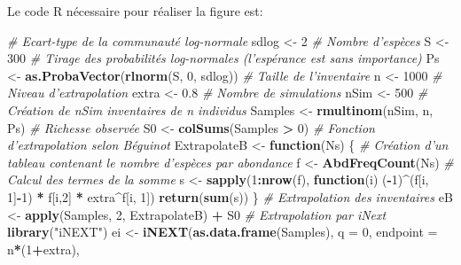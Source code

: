 \documentclass[
  11pt,
  french,
  a4paper,
  extrafontsizes,onecolumn,openright
  ]{memoir}
\newenvironment{Shaded}{\begin{snugshade}}{\end{snugshade}}
\newcommand{\CommentTok}[1]{\textcolor[rgb]{0.56,0.35,0.01}{\textit{#1}}}
\newcommand{\ControlFlowTok}[1]{\textcolor[rgb]{0.13,0.29,0.53}{\textbf{#1}}}
\newcommand{\DataTypeTok}[1]{\textcolor[rgb]{0.13,0.29,0.53}{#1}}
\newcommand{\DecValTok}[1]{\textcolor[rgb]{0.00,0.00,0.81}{#1}}
\newcommand{\FloatTok}[1]{\textcolor[rgb]{0.00,0.00,0.81}{#1}}
\newcommand{\KeywordTok}[1]{\textcolor[rgb]{0.13,0.29,0.53}{\textbf{#1}}}
\newcommand{\NormalTok}[1]{#1}
\newcommand{\OperatorTok}[1]{\textcolor[rgb]{0.81,0.36,0.00}{\textbf{#1}}}
\newcommand{\StringTok}[1]{\textcolor[rgb]{0.31,0.60,0.02}{#1}}
\begin{document}
Le code R nécessaire pour réaliser la figure est:

\scriptsize

\begin{Shaded}
\begin{Highlighting}[]
\CommentTok{# Ecart-type de la communauté log-normale}
\NormalTok{sdlog <-}\StringTok{ }\DecValTok{2}
\CommentTok{# Nombre d'espèces}
\NormalTok{S <-}\StringTok{ }\DecValTok{300}
\CommentTok{# Tirage des probabilités log-normales (l'espérance est sans importance)}
\NormalTok{Ps <-}\StringTok{ }\KeywordTok{as.ProbaVector}\NormalTok{(}\KeywordTok{rlnorm}\NormalTok{(S, }\DecValTok{0}\NormalTok{, sdlog))}
\CommentTok{# Taille de l'inventaire}
\NormalTok{n <-}\StringTok{ }\DecValTok{1000}
\CommentTok{# Niveau d'extrapolation}
\NormalTok{extra <-}\StringTok{ }\FloatTok{0.8}
\CommentTok{# Nombre de simulations}
\NormalTok{nSim <-}\StringTok{ }\DecValTok{500}
\CommentTok{# Création de nSim inventaires de n individus}
\NormalTok{Samples <-}\StringTok{ }\KeywordTok{rmultinom}\NormalTok{(nSim, n, Ps)}
\CommentTok{# Richesse observée}
\NormalTok{S0 <-}\StringTok{ }\KeywordTok{colSums}\NormalTok{(Samples }\OperatorTok{>}\StringTok{ }\DecValTok{0}\NormalTok{)}
\CommentTok{# Fonction d'extrapolation selon Béguinot}
\NormalTok{ExtrapolateB <-}\StringTok{ }\ControlFlowTok{function}\NormalTok{(Ns) \{}
  \CommentTok{# Création d'un tableau contenant le nombre d'espèces par abondance}
\NormalTok{  f <-}\StringTok{ }\KeywordTok{AbdFreqCount}\NormalTok{(Ns)}
  \CommentTok{# Calcul des termes de la somme}
\NormalTok{  s <-}\StringTok{ }\KeywordTok{sapply}\NormalTok{(}\DecValTok{1}\OperatorTok{:}\KeywordTok{nrow}\NormalTok{(f), }\ControlFlowTok{function}\NormalTok{(i) }
\NormalTok{              (}\OperatorTok{-}\DecValTok{1}\NormalTok{)}\OperatorTok{^}\NormalTok{(f[i, }\DecValTok{1}\NormalTok{]}\OperatorTok{-}\DecValTok{1}\NormalTok{) }\OperatorTok{*}\StringTok{ }\NormalTok{f[i,}\DecValTok{2}\NormalTok{] }\OperatorTok{*}\StringTok{ }\NormalTok{extra}\OperatorTok{^}\NormalTok{f[i, }\DecValTok{1}\NormalTok{])}
  \KeywordTok{return}\NormalTok{(}\KeywordTok{sum}\NormalTok{(s))}
\NormalTok{\}}
\CommentTok{# Extrapolation des inventaires}
\NormalTok{eB <-}\StringTok{ }\KeywordTok{apply}\NormalTok{(Samples, }\DecValTok{2}\NormalTok{, ExtrapolateB) }\OperatorTok{+}\StringTok{ }\NormalTok{S0}
\CommentTok{# Extrapolation par iNext}
\KeywordTok{library}\NormalTok{(}\StringTok{"iNEXT"}\NormalTok{)}
\NormalTok{ei <-}\StringTok{ }\KeywordTok{iNEXT}\NormalTok{(}\KeywordTok{as.data.frame}\NormalTok{(Samples), }\DataTypeTok{q =} \DecValTok{0}\NormalTok{, }\DataTypeTok{endpoint =}\NormalTok{ n}\OperatorTok{*}\NormalTok{(}\DecValTok{1}\OperatorTok{+}\NormalTok{extra), }

\end{Highlighting}
\end{Shaded}
\end{document}
